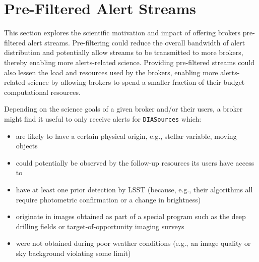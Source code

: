 \documentclass[DM,lsstdraft,authoryear,toc]{lsstdoc}
\begin{document}
\section{Pre-Filtered Alert Streams} \label{sec:prefilter}

This section explores the scientific motivation and impact of offering brokers pre-filtered alert streams. 
Pre-filtering could reduce the overall bandwidth of alert distribution and potentially allow streams to be transmitted to more brokers, thereby enabling more alerts-related science.
Providing pre-filtered streams could also lessen the load and resources used by the brokers, enabling more alerts-related science by allowing brokers to spend a smaller fraction of their budget computational resources.

Depending on the science goals of a given broker and/or their users, a broker might find it useful to only receive alerts for {\tt DIASources} which:
\begin{itemize}
\item are likely to have a certain physical origin, e.g., stellar variable, moving objects
\item could potentially be observed by the follow-up resources its users have access to
\item have at least one prior detection by LSST (because, e.g., their algorithms all require photometric confirmation or a change in brightness)
\item originate in images obtained as part of a special program such as the deep drilling fields or target-of-opportunity imaging surveys
\item were not obtained during poor weather conditions (e.g., an image quality or sky background violating some limit)
\end{itemize}
\end{document}
